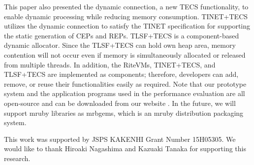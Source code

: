 \documentclass[a4j,12pt,oneside,openany,english]{jsbook}
\begin{document}
This paper also presented the dynamic connection, a new TECS functionality, to enable dynamic processing while reducing memory consumption.
TINET+TECS utilizes the dynamic connection to satisfy the TINET specification for supporting the static generation of CEPs and REPs.
TLSF+TECS is a component-based dynamic allocator.
Since the TLSF+TECS can hold own heap area, memory contention will not occur even if memory is simultaneously allocated or released from multiple threads.
In addition, the RiteVMs, TINET+TECS, and TLSF+TECS are implemented as components; therefore, developers can add, remove, or reuse their functionalities easily as required.
Note that our prototype system and the application programs used in the performance evaluation are all open-source and can be downloaded from our website \cite{url:TECS}.
In the future, we will support mruby libraries as mrbgems, which is an mruby distribution packaging system.

\begin{acknowledgment}
This work was supported by JSPS KAKENHI Grant Number 15H05305.
We would like to thank Hiroaki Nagashima and Kazuaki Tanaka for supporting this research.
\end{acknowledgment}




\end{document}
